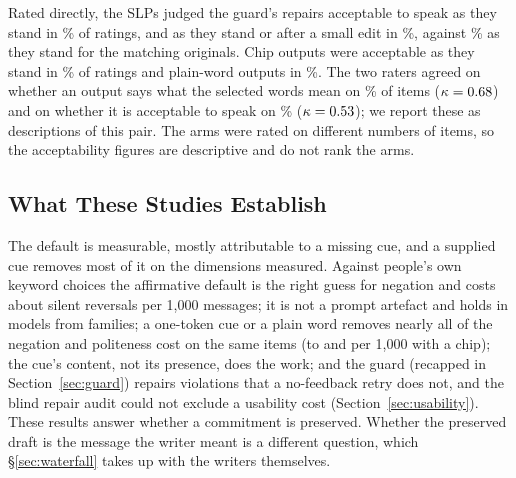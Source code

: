 Rated directly, the SLPs judged the guard's repairs acceptable to speak as they stand in \jmslpAccRepair{}\% of ratings, and as they stand or after a small edit in \jmslpRepairEdit{}\%, against \jmslpAccOrig{}\% as they stand for the matching originals. Chip outputs were acceptable as they stand in \jmslpAccChip{}\% of ratings and plain-word outputs in \jmslpAccWord{}\%. The two raters agreed on whether an output says what the selected words mean on \jmslpAgreeA{}\% of items ($\kappa=0.68{}$) and on whether it is acceptable to speak on \jmslpAgreeB{}\% ($\kappa=0.53{}$); we report these as descriptions of this pair. The arms were rated on different numbers of items, so the acceptability figures are descriptive and do not rank the arms.

\subsection{What These Studies Establish}\label{sec:establish}

The default is measurable, mostly attributable to a missing cue, and a supplied cue removes most of it on the dimensions measured. Against people's own keyword choices the affirmative default is the right guess for negation and costs about \jmtTwoRevPol{} silent reversals per 1,000 messages; it is not a prompt artefact and holds in \jmbreadthModels{} models from \jmbreadthFamilies{} families; a one-token cue or a plain word removes nearly all of the negation and politeness cost on the same items (to \jmfOneRevPolChip{} and \jmfOneRevPoliteChip{} per 1,000 with a chip); the cue's content, not its presence, does the work; and the guard (recapped in Section~\ref{sec:guard}) repairs violations that a no-feedback retry does not, and the blind repair audit could not exclude a usability cost (Section~\ref{sec:usability}). These results answer whether a commitment is preserved. Whether the preserved draft is the message the writer meant is a different question, which \S\ref{sec:waterfall} takes up with the writers themselves.
